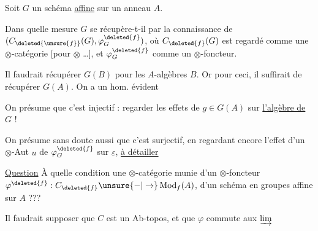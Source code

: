
Soit $G$ un schéma \uline{affine}  sur un anneau $A$.

Dans quelle mesure $G$ se récupère-t-il par la connaissance de $({C}_{\deleted{\unsure{f}}}(G),\varphi_G^{\deleted{f}})$, où $C_{\deleted{f}}(G)$ est regardé comme une $\otimes$-catégorie [pour $\otimes$ \ldots], et $\varphi_G^{\deleted{f}}$ comme un $\otimes$-foncteur.

Il faudrait récupérer $G(B)$ pour les $A$-algèbres $B$. Or pour ceci, il suffirait de récupérer $G(A)$. On a un hom. évident


On présume que c'est injectif : regarder les effets de $g\in G(A)$ \unsure{,} sur \uline{l'algèbre  de} $G$ !

On présume sans doute aussi que c'est surjectif, en regardant encore l'effet d'un $\otimes$-Aut $u$ de $\varphi_G^{\deleted{f}}$ sur $\varepsilon$,  \uline{à détailler}

\uline{Question} À quelle condition une $\otimes$-catégorie  munie d'un $\otimes$-foncteur $\varphi^{\deleted{f}}:C_{\deleted{f}}\unsure{-|\to}\operatorname{Mod}_{f}(A)$,  d'un schéma en groupes affine sur $A$ ???

Il faudrait supposer que $C$ est un Ab-topos, et que $\varphi$ commute aux $\varinjlim$

